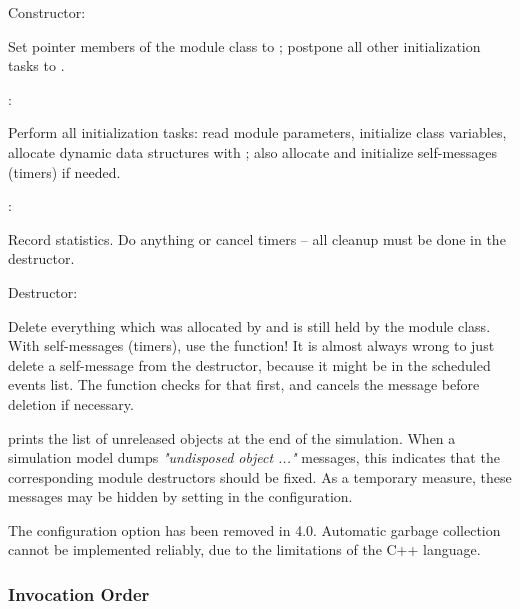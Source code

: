 \begin{description}

\item Constructor:

Set pointer members of the module class to ; postpone all other
initialization tasks to .

\item {}:

Perform all initialization tasks: read module parameters, initialize
class variables, allocate dynamic data structures with ;
also allocate and initialize self-messages (timers) if needed.

\item {}:

Record statistics. Do   anything or cancel timers --
all cleanup must be done in the destructor.

\item Destructor:

Delete everything which was allocated by  and is still held
by the module class. With self-messages (timers), use the
 function! It is almost always wrong
to just delete a self-message from the destructor, because it might be
in the scheduled events list. The  function
checks for that first, and cancels the message before deletion if necessary.

\end{description}

{\opp} prints the list of unreleased objects at the end of the simulation.
When a simulation model dumps \textit{"undisposed object ..."} messages, this indicates
that the corresponding module destructors should be fixed. As a temporary measure, these
messages may be hidden by setting  in the
configuration.

\begin{note}
    The  configuration option has been removed in {\opp} 4.0.
    Automatic garbage collection cannot be implemented reliably, due to the
    limitations of the C++ language.
\end{note}


\subsubsection{Invocation Order}
\label{sec:simple-modules:init-finish:invocation-order}

